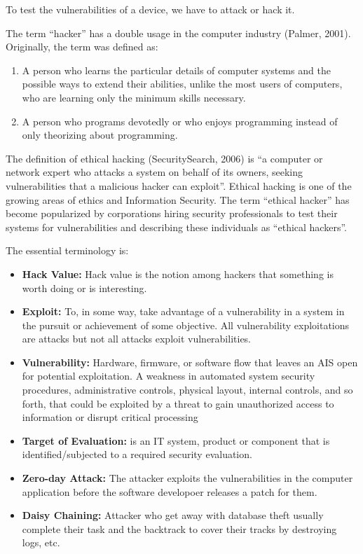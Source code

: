 
To test the vulnerabilities of a device, we have to attack or hack it.

The term ``hacker'' has a double usage in the computer industry (Palmer, 2001). Originally, the term was defined as:  
\begin{enumerate}
	\item A person who learns the particular details of computer systems and the possible ways to extend their abilities, unlike  the  most  users  of  computers,  who  are  learning  only the minimum skills necessary.  
	\item A person who programs devotedly or who enjoys programming instead of only theorizing about programming.
\end{enumerate}

The definition of ethical hacking (SecuritySearch, 2006) is  ``a computer or network expert who attacks a system on behalf of its owners, seeking vulnerabilities that a malicious hacker can exploit''. Ethical hacking is one of the growing areas of ethics and Information Security. The term ``ethical hacker'' has become popularized by corporations hiring security professionals to test their systems for vulnerabilities and describing these individuals as ``ethical hackers''.\cite{ethicalHacking}

The essential terminology is:

\begin{itemize}
	\item \textbf{Hack Value:} Hack value is the notion among hackers that something is worth doing or is interesting.
	\item \textbf{Exploit:} To, in some way, take advantage of a vulnerability in a system in the pursuit or achievement of some objective. All vulnerability exploitations are attacks but not all attacks exploit vulnerabilities.\cite{Hacking1}
	\item \textbf{Vulnerability:} Hardware, firmware, or software flow that leaves an AIS open for potential exploitation. A weakness in automated system security procedures, administrative controls, physical layout, internal controls, and so forth, that could be exploited by a threat to gain unauthorized access to information or disrupt critical processing
	\item \textbf{Target of Evaluation:} is an IT system, product or component that is identified/subjected to a required security evaluation.
	\item \textbf{Zero-day Attack:} The attacker exploits the vulnerabilities in the computer application before the software developoer releases a patch for them.
	\item \textbf{Daisy Chaining:} Attacker who get away with database theft usually complete their task and the backtrack to cover their tracks by destroying logs, etc.
\end{itemize}


